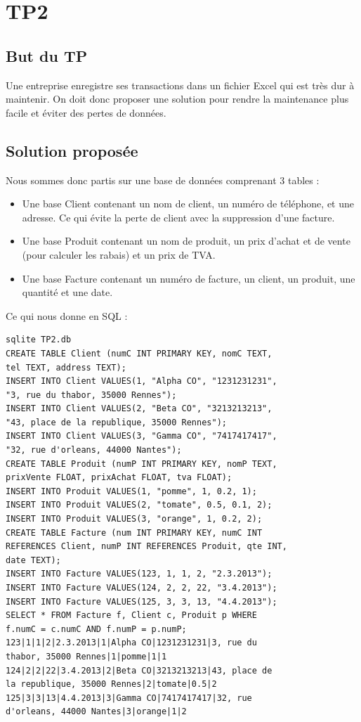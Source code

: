 \documentclass{article}
\begin{document}
\section{TP2}
\subsection{But du TP}
Une entreprise enregistre ses transactions dans un fichier Excel qui est tr\`es dur \`a maintenir. On doit donc proposer une solution pour rendre la maintenance plus facile et \'eviter des pertes de donn\'ees.
\subsection{Solution propos\'ee}
Nous sommes donc partis sur une base de donn\'ees comprenant 3 tables :
\begin{itemize}
  \item Une base Client contenant un nom de client, un num\'ero de t\'el\'ephone, et une adresse. Ce qui \'evite la perte de client avec la suppression d'une facture.
  \item Une base Produit contenant un nom de produit, un prix d'achat et de vente (pour calculer les rabais) et un prix de TVA.
  \item Une base Facture contenant un num\'ero de facture, un client, un produit, une quantit\'e et une date.  
\end{itemize}
Ce qui nous donne en SQL :\\
\begin{verbatim}
sqlite TP2.db
CREATE TABLE Client (numC INT PRIMARY KEY, nomC TEXT, 
tel TEXT, address TEXT);
INSERT INTO Client VALUES(1, "Alpha CO", "1231231231", 
"3, rue du thabor, 35000 Rennes");
INSERT INTO Client VALUES(2, "Beta CO", "3213213213", 
"43, place de la republique, 35000 Rennes");
INSERT INTO Client VALUES(3, "Gamma CO", "7417417417", 
"32, rue d'orleans, 44000 Nantes");
CREATE TABLE Produit (numP INT PRIMARY KEY, nomP TEXT, 
prixVente FLOAT, prixAchat FLOAT, tva FLOAT);
INSERT INTO Produit VALUES(1, "pomme", 1, 0.2, 1);
INSERT INTO Produit VALUES(2, "tomate", 0.5, 0.1, 2);
INSERT INTO Produit VALUES(3, "orange", 1, 0.2, 2);
CREATE TABLE Facture (num INT PRIMARY KEY, numC INT 
REFERENCES Client, numP INT REFERENCES Produit, qte INT,
date TEXT);
INSERT INTO Facture VALUES(123, 1, 1, 2, "2.3.2013");
INSERT INTO Facture VALUES(124, 2, 2, 22, "3.4.2013");
INSERT INTO Facture VALUES(125, 3, 3, 13, "4.4.2013");
SELECT * FROM Facture f, Client c, Produit p WHERE 
f.numC = c.numC AND f.numP = p.numP;
123|1|1|2|2.3.2013|1|Alpha CO|1231231231|3, rue du 
thabor, 35000 Rennes|1|pomme|1|1
124|2|2|22|3.4.2013|2|Beta CO|3213213213|43, place de 
la republique, 35000 Rennes|2|tomate|0.5|2
125|3|3|13|4.4.2013|3|Gamma CO|7417417417|32, rue 
d'orleans, 44000 Nantes|3|orange|1|2
\end{verbatim}
\end{document}
